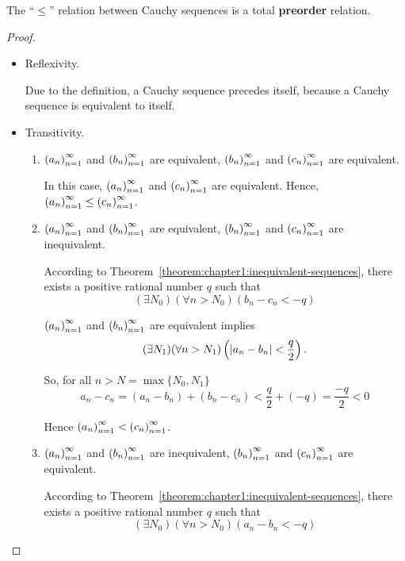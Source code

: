 \begin{theorem}\label{theorem:chapter1:preorder-and-cauchy-sequences}
    The ``$\le$'' relation between Cauchy sequences is a total \textbf{preorder} relation.
\end{theorem}

\begin{proof}
    \begin{itemize}
        \item Reflexivity.

              Due to the definition, a Cauchy sequence precedes itself, because a Cauchy sequence is equivalent to itself.
        \item Transitivity.

              \begin{enumerate}[label={\textbf{Case \arabic*.}},itemindent=0.5cm]
                  \item ${\left({a_{n}}\right)}^{\infty}_{n=1}$ and ${\left({b_{n}}\right)}^{\infty}_{n=1}$ are equivalent, ${\left({b_{n}}\right)}^{\infty}_{n=1}$ and ${\left({c_{n}}\right)}^{\infty}_{n=1}$ are equivalent.

                        In this case, ${\left({a_{n}}\right)}^{\infty}_{n=1}$ and ${\left({c_{n}}\right)}^{\infty}_{n=1}$ are equivalent. Hence, ${\left({a_{n}}\right)}^{\infty}_{n=1}\le{\left({c_{n}}\right)}^{\infty}_{n=1}$.
                  \item ${\left({a_{n}}\right)}^{\infty}_{n=1}$ and ${\left({b_{n}}\right)}^{\infty}_{n=1}$ are equivalent, ${\left({b_{n}}\right)}^{\infty}_{n=1}$ and ${\left({c_{n}}\right)}^{\infty}_{n=1}$ are inequivalent.

                        According to Theorem~\ref{theorem:chapter1:inequivalent-sequences}, there exists a positive rational number $q$ such that
                        \[
                            (\exists N_{0})(\forall n > N_{0})(b_{n} - c_{n} < -q)
                        \]

                        ${\left({a_{n}}\right)}^{\infty}_{n=1}$ and ${\left({b_{n}}\right)}^{\infty}_{n=1}$ are equivalent implies
                        \[
                            (\exists N_{1})(\forall n > N_{1})\left(\left\vert{a_{n} - b_{n}}\right\vert < \frac{q}{2}\right).
                        \]

                        So, for all $n > N = \max\{ N_{0}, N_{1} \}$
                        \[
                            a_{n} - c_{n} = (a_{n} - b_{n}) + (b_{n} - c_{n}) < \frac{q}{2} + (-q) = \frac{-q}{2} < 0
                        \]

                        Hence ${\left({a_{n}}\right)}^{\infty}_{n=1} < {\left({c_{n}}\right)}^{\infty}_{n=1}$.

                  \item ${\left({a_{n}}\right)}^{\infty}_{n=1}$ and ${\left({b_{n}}\right)}^{\infty}_{n=1}$ are inequivalent, ${\left({b_{n}}\right)}^{\infty}_{n=1}$ and ${\left({c_{n}}\right)}^{\infty}_{n=1}$ are equivalent.

                        According to Theorem~\ref{theorem:chapter1:inequivalent-sequences}, there exists a positive rational number $q$ such that
                        \[
                            (\exists N_{0})(\forall n > N_{0})(a_{n} - b_{n} < -q)
                        \]


\end{enumerate}
\end{itemize}
\end{proof}
